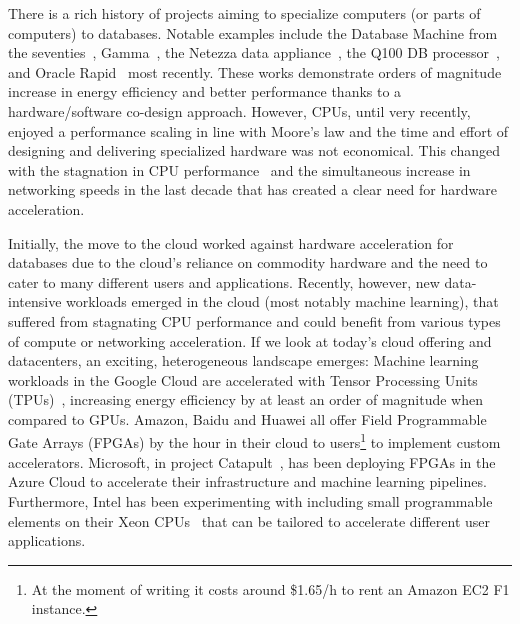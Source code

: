 \documentclass[11pt]{article}
\begin{document}
There is a rich history of projects aiming to specialize computers (or parts of computers) to databases. Notable examples include the Database Machine from the seventies~\cite{banerjee-databasemachine-79}, Gamma~\cite{dewitt-gamma-1990}, the Netezza data appliance~\cite{francesco-netezza-2011}, the Q100 DB processor~\cite{wu-q100-asplos14}, and Oracle Rapid~\cite{agrawal-rapid-17} most recently. These works demonstrate orders of magnitude increase in energy efficiency and better performance thanks to a hardware/software co-design approach. However, CPUs, until very recently, enjoyed a performance scaling in line with Moore's law and the time and effort of designing and delivering specialized hardware was not economical. This changed with the stagnation in CPU performance~\cite{esmaeilzadeh-darksilicon-isca11} and the simultaneous increase in networking speeds in the last decade that has created a clear need for hardware acceleration. 

Initially, the move to the cloud worked against hardware acceleration for databases due to the cloud's reliance on commodity hardware and the need to cater to many different users and applications. Recently, however, new data-intensive workloads emerged in the cloud (most notably machine learning), that suffered from stagnating CPU performance and could benefit from various types of compute or networking acceleration. If we look at today's cloud offering and datacenters, an exciting, heterogeneous landscape emerges: Machine learning workloads in the Google Cloud are accelerated with Tensor Processing Units (TPUs)~\cite{sato-tpu-google17}, increasing energy efficiency by at least an order of magnitude when compared to GPUs. Amazon, Baidu and Huawei all offer Field Programmable Gate Arrays (FPGAs) by the hour in their cloud to users\footnote{At the moment of writing it costs around \$1.65/h to rent an Amazon EC2 F1 instance.} to implement custom accelerators. Microsoft, in project Catapult~\cite{firestone-catapult-nsdi18}, has been deploying FPGAs in the Azure Cloud to accelerate their infrastructure and machine learning pipelines. Furthermore, Intel has been experimenting with including small programmable elements on their Xeon CPUs~\cite{gupta-harp-fpl16} that can be tailored to accelerate different user applications. 
\end{document}
